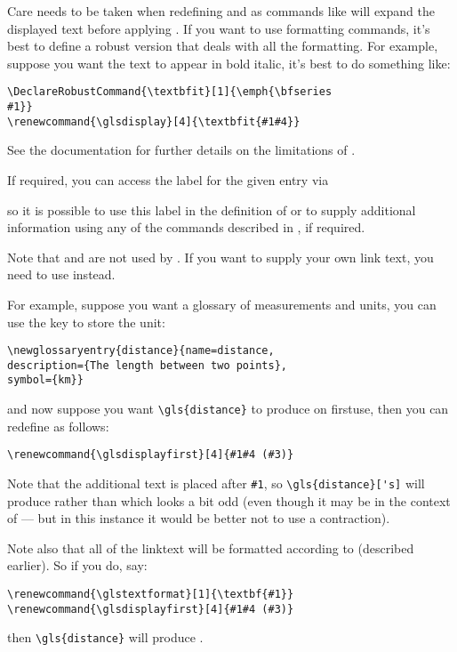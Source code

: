 \documentclass[report]{nlctdoc}
\newcommand*{\firstuse}{\gls{firstuse}}
\newcommand*{\gloskey}[2][newglossaryentry]{\csopt{#1}{#2}}
\begin{document}
\begin{important}
Care needs to be taken when redefining  and
 as commands like  will expand the
displayed text before applying . If you want to use
formatting commands, it's best to define a robust version that deals
with all the formatting. For example, suppose you want
the text to appear in bold italic, it's best to do something like:
\begin{verbatim}
\DeclareRobustCommand{\textbfit}[1]{\emph{\bfseries 
#1}}
\renewcommand{\glsdisplay}[4]{\textbfit{#1#4}}
\end{verbatim}
See the  documentation for further details on the
limitations of .
\end{important}

If required, you can access the label for the given entry via
\begin{definition}[\DescribeMacro{\glslabel}]
\end{definition}
so it is possible to use this label in the definition of
 or  to supply additional
information using any of the commands described in
, if required.

Note that  and  are not used
by . If you want to supply your own link text, you
need to use  instead.

For example, suppose you want a glossary of measurements and
units, you can use the \gloskey{symbol} key to store the unit:
\begin{verbatim}
\newglossaryentry{distance}{name=distance,
description={The length between two points},
symbol={km}}
\end{verbatim}
and now suppose you want \verb|\gls{distance}| to produce
 on \firstuse, then you can redefine
 as follows:
\begin{verbatim}
\renewcommand{\glsdisplayfirst}[4]{#1#4 (#3)}
\end{verbatim}
Note that the additional text is placed after \verb|#1|, so
\verb|\gls{distance}['s]| will produce 
rather than  which looks a bit odd (even though
it may be in the context of  --- but in this instance it would be better not to
use a contraction).

Note also that all of the \gls{linktext} will be formatted according
to  (described earlier). So if you do, say:
\begin{verbatim}
\renewcommand{\glstextformat}[1]{\textbf{#1}}
\renewcommand{\glsdisplayfirst}[4]{#1#4 (#3)}
\end{verbatim}
then \verb|\gls{distance}| will produce .
\end{document}

